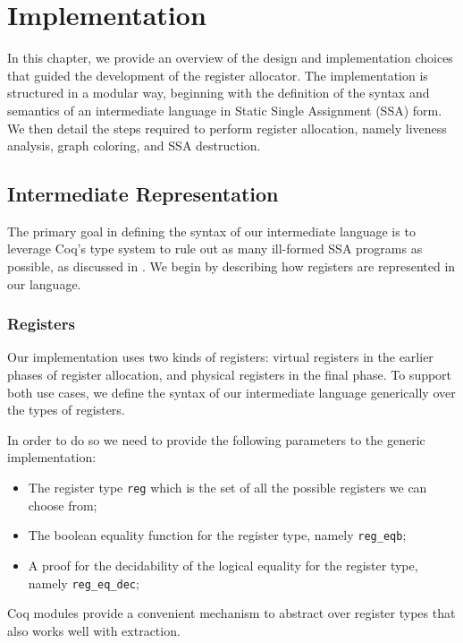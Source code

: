 
\chapter{Implementation}
\label{cha:implementation}

In this chapter, we provide an overview of the design and implementation choices that guided the development of the register allocator. The implementation is structured in a modular way, beginning with the definition of the syntax and semantics of an intermediate language in Static Single Assignment (SSA) form. We then detail the steps required to perform register allocation, namely liveness analysis, graph coloring, and SSA destruction.

\section{Intermediate Representation}
\label{sec:ir}

The primary goal in defining the syntax of our intermediate language is to leverage Coq’s type system to rule out as many ill-formed SSA programs as possible, as discussed in . We begin by describing how registers are represented in our language.

\subsection{Registers}

Our implementation uses two kinds of registers: virtual registers in the earlier phases of register allocation, and physical registers in the final phase. To support both use cases, we define the syntax of our intermediate language generically over the types of registers.

In order to do so we need to provide the following parameters to the generic implementation:
\begin{itemize}
    \item The register type \texttt{reg} which is the set of all the possible registers we can choose from;
    \item The boolean equality function for the register type, namely \texttt{reg\_eqb};
    \item A proof for the decidability of the logical equality for the register type, namely \texttt{reg\_eq\_dec};
\end{itemize}

Coq modules provide a convenient mechanism to abstract over register types that also works well with extraction.

